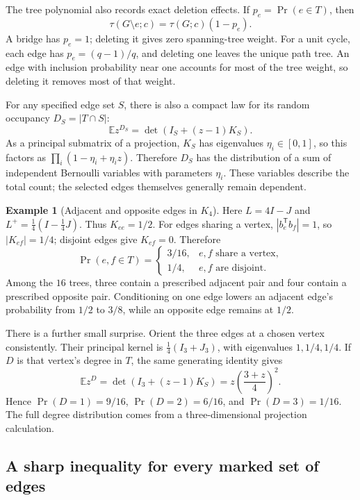 \documentclass[11pt]{article}
\theoremstyle{definition}
\newtheorem{example}[theorem]{Example}
\theoremstyle{remark}
\begin{document}
The tree polynomial also records exact deletion effects. If $p_e=\Pr(e\in T)$, then
\[
 \tau(G\setminus e;c)=\tau(G;c)(1-p_e).
\]
A bridge has $p_e=1$; deleting it gives zero spanning-tree weight. For a unit cycle, each edge has $p_e=(q-1)/q$, and deleting one leaves the unique path tree. An edge with inclusion probability near one accounts for most of the tree weight, so deleting it removes most of that weight.

For any specified edge set $S$, there is also a compact law for its random occupancy $D_S=|T\cap S|$:
\[
 \mathbb E z^{D_S}=\det(I_S+(z-1)K_S).
\]
As a principal submatrix of a projection, $K_S$ has eigenvalues $\eta_i\in[0,1]$, so this factors as $\prod_i(1-\eta_i+\eta_i z)$. Therefore $D_S$ has the distribution of a sum of independent Bernoulli variables with parameters $\eta_i$. These variables describe the total count; the selected edges themselves generally remain dependent.

\begin{example}[Adjacent and opposite edges in $K_4$]\label{ex:glin-k4}
Here $L=4I-J$ and $L^+=\tfrac14(I-\tfrac14J)$. Thus $K_{ee}=1/2$. For edges sharing a vertex, $|b_e^{\mathsf T}b_f|=1$, so $|K_{ef}|=1/4$; disjoint edges give $K_{ef}=0$. Therefore
\[
 \Pr(e,f\in T)=
 \begin{cases}
 3/16,&e,f\text{ share a vertex},\\
 1/4,&e,f\text{ are disjoint}.
 \end{cases}
\]
Among the $16$ trees, three contain a prescribed adjacent pair and four contain a prescribed opposite pair. Conditioning on one edge lowers an adjacent edge's probability from $1/2$ to $3/8$, while an opposite edge remains at $1/2$.

There is a further small surprise. Orient the three edges at a chosen vertex consistently. Their principal kernel is $\tfrac14(I_3+J_3)$, with eigenvalues $1,1/4,1/4$. If $D$ is that vertex's degree in $T$, the same generating identity gives
\[
 \mathbb E z^D=\det(I_3+(z-1)K_S)
 =z\left(\frac{3+z}{4}\right)^2.
\]
Hence $\Pr(D=1)=9/16$, $\Pr(D=2)=6/16$, and $\Pr(D=3)=1/16$. The full degree distribution comes from a three-dimensional projection calculation.
\end{example}

\subsection{A sharp inequality for every marked set of edges}
\label{sec:marked-tree-inequality}
\end{document}
